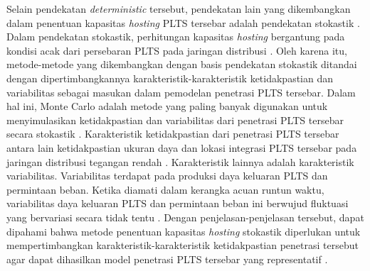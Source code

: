 Selain pendekatan \textit{deterministic} tersebut, pendekatan lain yang dikembangkan dalam penentuan kapasitas \textit{hosting} PLTS tersebar adalah pendekatan stokastik \cite{breker_capacity_2015,kolenc_assessment_2015,bollen_hosting_2017}. Dalam pendekatan stokastik, perhitungan kapasitas \textit{hosting} bergantung pada kondisi acak dari persebaran PLTS pada jaringan distribusi \cite{breker_capacity_2015}. Oleh karena itu, metode-metode yang dikembangkan dengan basis pendekatan stokastik ditandai dengan dipertimbangkannya karakteristik-karakteristik ketidakpastian dan variabilitas sebagai masukan dalam pemodelan penetrasi PLTS tersebar. Dalam hal ini, Monte Carlo adalah metode yang paling banyak digunakan untuk menyimulasikan ketidakpastian dan variabilitas dari penetrasi PLTS tersebar secara stokastik \cite{torquato_comprehensive_2018,gooding_probability_2014,dubey_estimation_2017,wang_interval_2020,bollen_hosting_2017,reno_novel_2016,electric_power_research_institute_stochastic_2012,kolenc_assessment_2015}. Karakteristik ketidakpastian dari penetrasi PLTS tersebar antara lain ketidakpastian ukuran daya dan lokasi integrasi PLTS tersebar pada jaringan distribusi tegangan rendah \cite{dubey_understanding_2015,electric_power_research_institute_stochastic_2012,ding_distributed_2017,ding_distributed_2017}. %
Karakteristik lainnya adalah karakteristik variabilitas. Variabilitas terdapat pada produksi daya keluaran PLTS dan permintaan beban. Ketika diamati dalam kerangka acuan runtun waktu, variabilitas daya keluaran PLTS dan permintaan beban ini berwujud fluktuasi yang bervariasi secara tidak tentu \cite{behravesh_stochastic_2018,wang_interval_2020}. Dengan penjelasan-penjelasan tersebut, dapat dipahami bahwa metode penentuan kapasitas \textit{hosting} stokastik diperlukan untuk mempertimbangkan karakteristik-karakteristik ketidakpastian penetrasi tersebut agar dapat dihasilkan model penetrasi PLTS tersebar yang representatif \cite{gooding_probability_2014,ding_distributed_2017,wang_interval_2020}.

